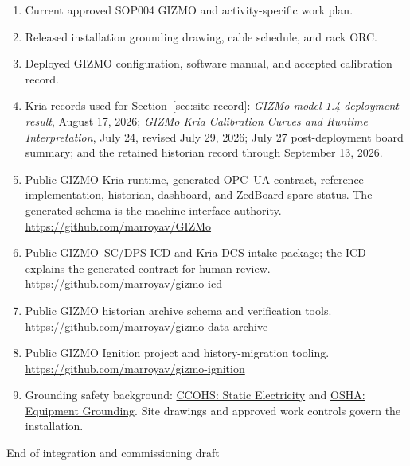 \documentclass[11pt]{article}
\begin{document}
\begin{enumerate}
  \item Current approved SOP004 GIZMO and activity-specific work plan.
  \item Released installation grounding drawing, cable schedule, and rack ORC.
  \item Deployed GIZMO configuration, software manual, and accepted calibration record.

  \item Kria records used for Section~\ref{sec:site-record}: \emph{GIZMo model 1.4 deployment result}, August 17, 2026; \emph{GIZMo Kria Calibration Curves and Runtime Interpretation}, July 24, revised July 29, 2026; July 27 post-deployment board summary; and the retained historian record through September 13, 2026.

  \item Public GIZMO Kria runtime, generated OPC~UA contract, reference
  implementation, historian, dashboard, and ZedBoard-spare status. The
  generated schema is the machine-interface authority.\\
  \url{https://github.com/marroyav/GIZMo}

  \item Public GIZMO--SC/DPS ICD and Kria DCS intake package; the ICD
  explains the generated contract for human review.\\
  \url{https://github.com/marroyav/gizmo-icd}

  \item Public GIZMO historian archive schema and verification tools.\\
  \url{https://github.com/marroyav/gizmo-data-archive}

  \item Public GIZMO Ignition project and history-migration tooling.\\
  \url{https://github.com/marroyav/gizmo-ignition}

  \item Grounding safety background: \href{https://www.ccohs.ca/oshanswers/chemicals/static-electricity.html}{CCOHS: Static Electricity} and \href{https://www.osha.gov/etools/construction/electrical-incidents/grounding}{OSHA: Equipment Grounding}. Site drawings and approved work controls govern the installation.
\end{enumerate}


\vfill
\begin{center}
\small\textcolor{dunegray}{End of integration and commissioning draft}
\end{center}
\end{document}
